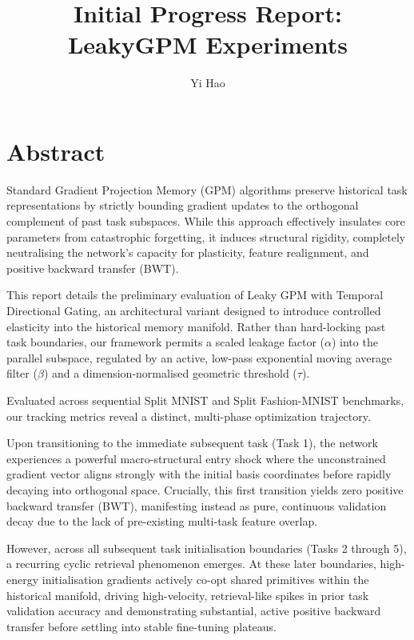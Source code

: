 \documentclass[10pt,a4paper]{article}
\title{Initial Progress Report: LeakyGPM Experiments}
\author{Yi Hao}
\begin{document}
	\vspace{-1em}
	\maketitle
	
	\section*{Abstract}
	Standard Gradient Projection Memory (GPM) algorithms preserve historical task representations by strictly bounding gradient updates to the orthogonal complement of past task subspaces. While this approach effectively insulates core parameters from catastrophic forgetting, it induces structural rigidity, completely neutralising the network's capacity for plasticity, feature realignment, and positive backward transfer (BWT).
	
	This report details the preliminary evaluation of Leaky GPM with Temporal Directional Gating, an architectural variant designed to introduce controlled elasticity into the historical memory manifold. Rather than hard-locking past task boundaries, our framework permits a scaled leakage factor ($\alpha$) into the parallel subspace, regulated by an active, low-pass exponential moving average filter ($\beta$) and a dimension-normalised geometric threshold ($\tau$).
	
	Evaluated across sequential Split MNIST and Split Fashion-MNIST benchmarks, our tracking metrics reveal a distinct, multi-phase optimization trajectory. 
	
	Upon transitioning to the immediate subsequent task (Task 1), the network experiences a powerful macro-structural entry shock where the unconstrained gradient vector aligns strongly with the initial basis coordinates before rapidly decaying into orthogonal space. Crucially, this first transition yields zero positive backward transfer (BWT), manifesting instead as pure, continuous validation decay due to the lack of pre-existing multi-task feature overlap. 
	
	However, across all subsequent task initialisation boundaries (Tasks 2 through 5), a recurring cyclic retrieval phenomenon emerges. At these later boundaries, high-energy initialisation gradients actively co-opt shared primitives within the historical manifold, driving high-velocity, retrieval-like spikes in prior task validation accuracy and demonstrating substantial, active positive backward transfer before settling into stable fine-tuning plateaus.
	
\end{document}
